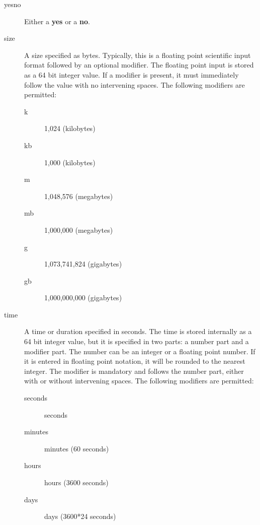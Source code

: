 \begin{description}
\item [yes{\textbar}no]
   Either a {\bf yes} or a {\bf no}.

\label{Size1}
\item [size]
A size specified as bytes. Typically, this is  a floating point scientific
input format followed by an optional modifier. The  floating point input is
stored as a 64 bit integer value.  If a modifier is present, it must
immediately follow the  value with no intervening spaces. The following
modifiers are permitted:

\begin{description}
\item [k]
   1,024 (kilobytes)

\item [kb]
   1,000 (kilobytes)

\item [m]
   1,048,576 (megabytes)

\item [mb]
   1,000,000 (megabytes)

\item [g]
   1,073,741,824 (gigabytes)

\item [gb]
   1,000,000,000 (gigabytes)
\end{description}

\label{Time}
\item [time]
A time or duration specified in seconds.  The time is stored internally as
a 64 bit integer value, but it is specified in two parts: a number part and
a modifier part.  The number can be an integer or a floating point number.
If it is entered in floating point notation, it will be rounded to the
nearest integer.  The modifier is mandatory and follows the number part,
either with or without intervening spaces.  The following modifiers are
permitted:

\begin{description}

\item [seconds]
   seconds

\item [minutes]
   minutes (60 seconds)

\item [hours]
   hours (3600 seconds)

\item [days]
   days (3600*24 seconds)


\end{description}
\end{description}
